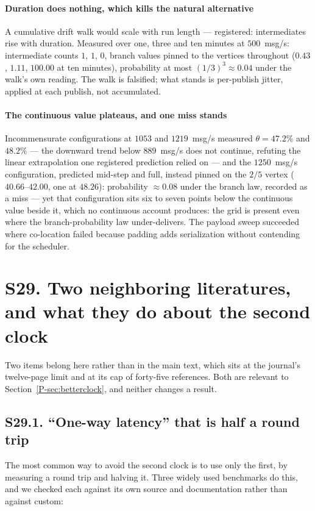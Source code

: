 \documentclass[10pt,journal,onecolumn]{IEEEtran}
\newcommand{\mainBetterClock}{\ref{P-sec:betterclock}}    %
\begin{document}
\paragraph{Duration does nothing, which kills the natural alternative} A cumulative
drift walk would scale with run length --- registered: intermediates rise with duration.
Measured over one, three and ten minutes at $500$~msg/s: intermediate counts $1$, $1$, $0$,
branch values pinned to the vertices throughout ($0.43$, $1.11$, $100.00$ at ten
minutes), probability at most $(1/3)^3 \approx 0.04$ under the walk's own reading. The
walk is falsified; what stands is per-publish jitter, applied at each publish, not accumulated.

\paragraph{The continuous value plateaus, and one miss stands} Incommensurate configurations at
$1053$ and $1219$~msg/s measured $\theta = 47.2\%$ and $48.2\%$ --- the downward trend below
$889$~msg/s does not continue, refuting the linear extrapolation one registered prediction
relied on --- and the $1250$~msg/s configuration, predicted mid-step and full, instead pinned on the $2/5$ vertex
($40.66$--$42.00$, one at $48.26$): probability $\approx 0.08$ under the branch law,
recorded as a miss --- yet that configuration sits six to seven points below the continuous value
beside it, which no continuous account produces: the grid is present even where the
branch-probability law under-delivers. The payload sweep succeeded where co-location failed because padding adds serialization without contending for the scheduler.

\section{S29. Two neighboring literatures, and what they do about the second clock}
\label{sec:twoclock}

Two items belong here rather than in the main text, which sits at the journal's
twelve-page limit and at its cap of forty-five references. Both are relevant
to Section~\mainBetterClock{}, and neither changes a result.

\subsection{S29.1. ``One-way latency'' that is half a round trip}

The most common way to avoid the second clock is to use only the first, by measuring a round
trip and halving it. Three widely used benchmarks do this, and we checked each against its
own source and documentation rather than against custom:
\end{document}
